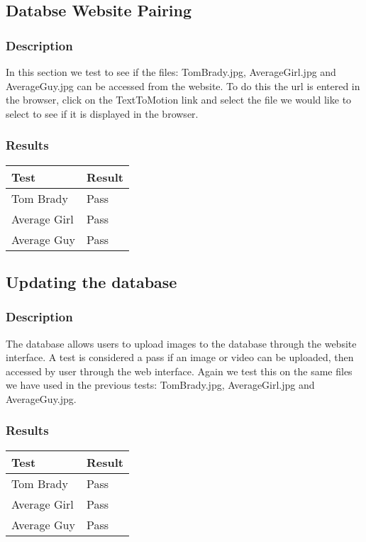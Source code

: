 \documentclass{scrreprt}
\begin{document}
\subsection{Databse Website Pairing}

\subsubsection{Description}

In this section we test to see if the files: TomBrady.jpg, AverageGirl.jpg and
AverageGuy.jpg can be accessed from the website.  To do this the url is
entered in the browser, click on the TextToMotion link and select the file we
would like to select to see if it is displayed in the browser.

\subsubsection{Results}
 \centering
 \begin{tabular}{||p{2.5cm}|p{2.5cm}||}
 \hline
 \bf Test & \bf Result\\
 \hline\hline
  Tom Brady & Pass  \\
   \hline\hline
  Average Girl & Pass  \\
   \hline\hline
  Average Guy & Pass  \\
\hline

 \hline
 \end{tabular}

\subsection{Updating the database}
\subsubsection{Description}

The database allows users to upload images to the database through the website
interface. A test is considered a pass if an image or video can be uploaded,
then accessed by user through the web interface.  Again we test this on the
same files we have used in the previous tests: TomBrady.jpg, AverageGirl.jpg
and AverageGuy.jpg.

\subsubsection{Results}
 \centering
 \begin{tabular}{||p{2.5cm}|p{2.5cm}||}
 \hline
 \bf Test & \bf Result\\
 \hline\hline
  Tom Brady & Pass  \\
   \hline\hline
  Average Girl & Pass  \\
   \hline\hline
  Average Guy & Pass  \\
\hline

 \hline
 \end{tabular}
\end{document}
